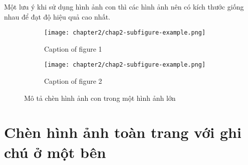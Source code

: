 Một lưu ý khi sử dụng hình ảnh con thì các hình ảnh nên có kích thước giống nhau để đạt độ hiệu quả cao nhất.

\begin{figure}
    \begin{subfigure}{0.5\textwidth}
        \centering
        \texttt{[image: chapter2/chap2-subfigure-example.png]}
        \caption{Caption of figure 1}
        \label{fig:chap2-subfigure-example-1}
    \end{subfigure}%
    \begin{subfigure}{0.5\textwidth}
        \centering
        \texttt{[image: chapter2/chap2-subfigure-example.png]}
        \caption{Caption of figure 2}
        \label{fig:chap2-subfigure-example-2}
    \end{subfigure}
    \caption{Mô tả chèn hình ảnh con trong một hình ảnh lớn}
    \label{fig:chap2-subfigure-example}
\end{figure}

\section{Chèn hình ảnh toàn trang với ghi chú ở một bên}

          

\begin{figure}[ht]
  \end{figure}